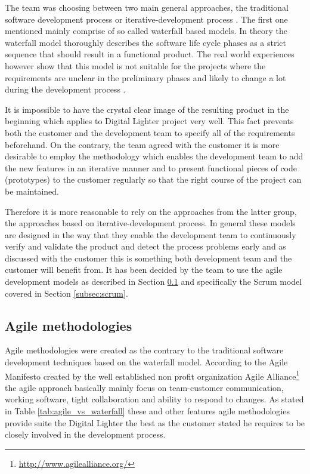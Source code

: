 The team was choosing between two main general approaches, the traditional software development process or iterative-development process \cite{fairley2009managing}. The first one mentioned mainly comprise of so called waterfall based models. In theory the waterfall model thoroughly describes the software life cycle phases as a strict sequence that should result in a functional product. The real world experiences however show that this model is not suitable for the projects where the requirements are unclear in the preliminary phases and likely to change a lot during the development process \cite{john2011software}.

It is impossible to have the crystal clear image of the resulting product in the beginning\cite{fairley2009managing} which applies to Digital Lighter project very well. This fact prevents both the customer and the development team to specify all of the requirements beforehand. On the contrary, the team agreed with the customer it is more desirable to employ the methodology which enables the development team to add the new features in an iterative manner and to present functional pieces of code (prototypes) to the customer regularly so that the right course of the project can be maintained.

Therefore it is more reasonable to rely on the approaches from the latter group, the approaches based on iterative-development process. In general these models are designed in the way that they enable the development team to continuously verify and validate the product and detect the process problems early and as discussed with the customer this is something both development team and the customer will benefit from. It has been decided by the team to use the agile development models as described in Section \ref{subsec:agile_methodologies} and specifically the Scrum model covered in Section \ref{subsec:scrum}.

\subsection{Agile methodologies} \label{subsec:agile_methodologies}
Agile methodologies were created as the contrary to the traditional software development techniques based on the waterfall model. According to the Agile Manifesto \cite{agileManifesto} created by the well established non profit organization Agile Alliance\footnote{\url{http://www.agilealliance.org/}} the agile approach basically mainly focus on team-customer communication, working software, tight collaboration and ability to respond to changes. As stated in Table \ref{tab:agile_vs_waterfall} these and other features agile methodologies provide suite the Digital Lighter the best as the customer stated he requires to be closely involved in the development process.

